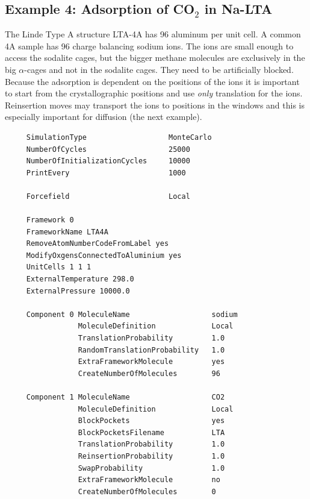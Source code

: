 \subsection*{Example 4: Adsorption of CO$_2$ in Na-LTA}

The Linde Type A structure LTA-4A has 96 aluminum per unit cell. A common 4A sample has 96 charge balancing sodium ions.
The ions are small enough to access the sodalite cages, but the bigger methane molecules are exclusively in the big $\alpha$-cages
and not in the sodalite cages. They need to be artificially blocked. 
Because the adsorption is dependent on the positions of the ions it is
important to start from the crystallographic positions and use \emph{only} translation for the ions. Reinsertion moves may transport the ions
to positions in the windows and this is especially important for diffusion (the next example).

\begin{tiny}
\begin{verbatim}
     SimulationType                   MonteCarlo
     NumberOfCycles                   25000
     NumberOfInitializationCycles     10000
     PrintEvery                       1000
     
     Forcefield                       Local
     
     Framework 0
     FrameworkName LTA4A
     RemoveAtomNumberCodeFromLabel yes
     ModifyOxgensConnectedToAluminium yes
     UnitCells 1 1 1
     ExternalTemperature 298.0
     ExternalPressure 10000.0
     
     Component 0 MoleculeName                   sodium
                 MoleculeDefinition             Local
                 TranslationProbability         1.0
                 RandomTranslationProbability   1.0
                 ExtraFrameworkMolecule         yes
                 CreateNumberOfMolecules        96
     
     Component 1 MoleculeName                   CO2
                 MoleculeDefinition             Local
                 BlockPockets                   yes
                 BlockPocketsFilename           LTA
                 TranslationProbability         1.0
                 ReinsertionProbability         1.0
                 SwapProbability                1.0
                 ExtraFrameworkMolecule         no
                 CreateNumberOfMolecules        0
\end{verbatim}
\end{tiny}

